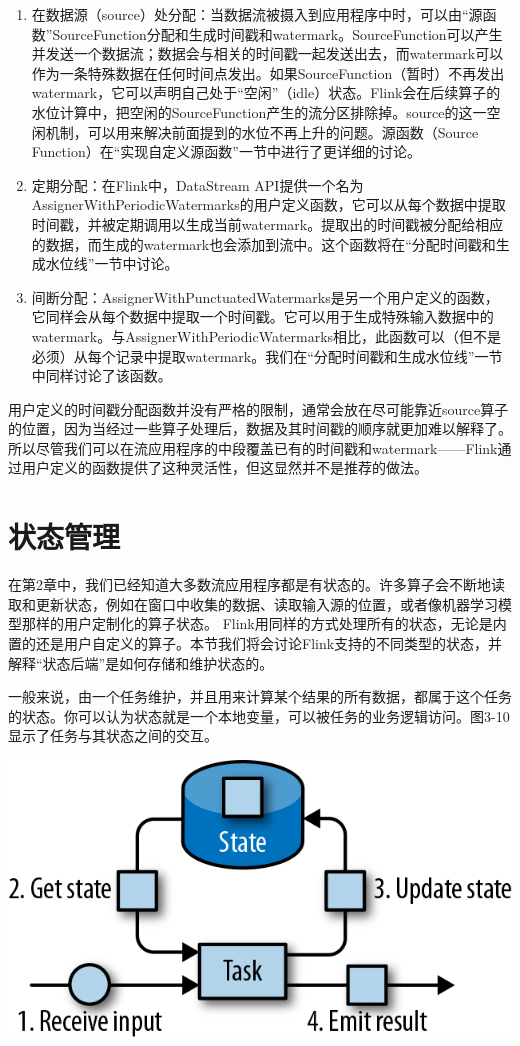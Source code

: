 \documentclass[oneside]{ctexbook}
\begin{document}
\begin{enumerate}
  \item 在数据源（source）处分配：当数据流被摄入到应用程序中时，可以由“源函数”SourceFunction分配和生成时间戳和watermark。SourceFunction可以产生并发送一个数据流；数据会与相关的时间戳一起发送出去，而watermark可以作为一条特殊数据在任何时间点发出。如果SourceFunction（暂时）不再发出watermark，它可以声明自己处于“空闲”（idle）状态。Flink会在后续算子的水位计算中，把空闲的SourceFunction产生的流分区排除掉。source的这一空闲机制，可以用来解决前面提到的水位不再上升的问题。源函数（Source Function）在“实现自定义源函数”一节中进行了更详细的讨论。
  \item 定期分配：在Flink中，DataStream API提供一个名为AssignerWithPeriodicWatermarks的用户定义函数，它可以从每个数据中提取时间戳，并被定期调用以生成当前watermark。提取出的时间戳被分配给相应的数据，而生成的watermark也会添加到流中。这个函数将在“分配时间戳和生成水位线”一节中讨论。
  \item 间断分配：AssignerWithPunctuatedWatermarks是另一个用户定义的函数，它同样会从每个数据中提取一个时间戳。它可以用于生成特殊输入数据中的watermark。与AssignerWithPeriodicWatermarks相比，此函数可以（但不是必须）从每个记录中提取watermark。我们在“分配时间戳和生成水位线”一节中同样讨论了该函数。
\end{enumerate}

用户定义的时间戳分配函数并没有严格的限制，通常会放在尽可能靠近source算子的位置，因为当经过一些算子处理后，数据及其时间戳的顺序就更加难以解释了。所以尽管我们可以在流应用程序的中段覆盖已有的时间戳和watermark——Flink通过用户定义的函数提供了这种灵活性，但这显然并不是推荐的做法。

\section{状态管理}

在第2章中，我们已经知道大多数流应用程序都是有状态的。许多算子会不断地读取和更新状态，例如在窗口中收集的数据、读取输入源的位置，或者像机器学习模型那样的用户定制化的算子状态。 Flink用同样的方式处理所有的状态，无论是内置的还是用户自定义的算子。本节我们将会讨论Flink支持的不同类型的状态，并解释“状态后端”是如何存储和维护状态的。

一般来说，由一个任务维护，并且用来计算某个结果的所有数据，都属于这个任务的状态。你可以认为状态就是一个本地变量，可以被任务的业务逻辑访问。图3-10显示了任务与其状态之间的交互。

\noindent \includegraphics[width=\textwidth]{spaf_0310.png}
\end{document}
